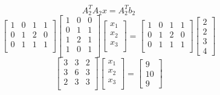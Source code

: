 \documentclass[unicode,11pt,a4paper,oneside,numbers=endperiod,openany]{scrartcl}
\begin{document}
\begin{itemize}
    \begin{equation}
	    A_2^TA_2x = A_2^Tb_2
	\end{equation}
    \[
    	\begin{bmatrix}
            1 & 0 & 1 & 1 \\
            0 & 1 & 2 & 0 \\
            0 & 1 & 1 & 1 \\
        \end{bmatrix}
        \begin{bmatrix}
           1 & 0 & 0 \\
            0 & 1 & 1 \\
            1 & 2 & 1 \\
            1 & 0 & 1 \\
        \end{bmatrix}
        \begin{bmatrix}
            x_1 \\ x_2 \\ x_3 \\
        \end{bmatrix}
        =
        \begin{bmatrix}
            1 & 0 & 1 & 1 \\
            0 & 1 & 2 & 0 \\
            0 & 1 & 1 & 1 \\
        \end{bmatrix}
        \begin{bmatrix}
            2 \\ 2 \\ 3 \\ 4
        \end{bmatrix}
    \]
    \[
        \begin{bmatrix}
        3 & 3 & 2\\
        3 & 6 & 3 \\
        2 & 3 & 3 \\
        \end{bmatrix}
        \begin{bmatrix}
        x_1 \\ x_2 \\ x_3 \\
        \end{bmatrix}
        =
        \begin{bmatrix}
        9 \\ 10 \\ 9
        \end{bmatrix}
    \]
    

\end{itemize}
\end{document}
